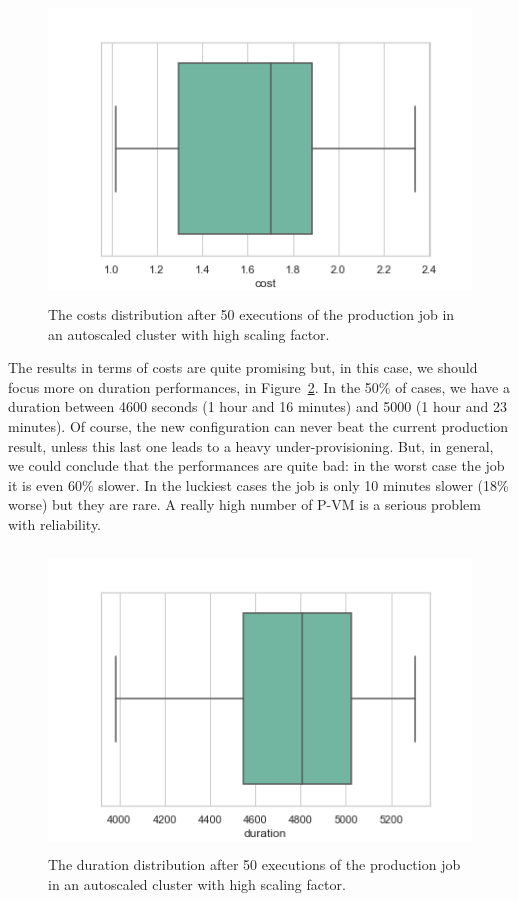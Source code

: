 \documentclass[12pt,twoside,cucitura]{toptesi}
\begin{document}
\begin{figure}
\centering
\includegraphics[height=80mm]{high-cost}
\caption{The costs distribution after 50 executions of the production job in an autoscaled cluster with high scaling factor.}\label{fig:high-cost}
\end{figure}

The results in terms of costs are quite promising but, in this case, we should focus more on duration performances, in Figure~\ref{fig:high-duration}. In the 50\% of cases, we have a duration between 4600 seconds (1 hour and 16 minutes) and 5000 (1 hour and 23 minutes). Of course, the new configuration can never beat the current production result, unless this last one leads to a heavy under-provisioning. But, in general, we could conclude that the performances are quite bad: in the worst case the job it is even 60\% slower. In the luckiest cases the job is only 10 minutes slower (18\% worse) but they are rare. A really high number of P-VM is a serious problem with reliability.

\begin{figure}
\centering
\includegraphics[height=80mm]{high-duration}
\caption{The duration distribution after 50 executions of the production job in an autoscaled cluster with high scaling factor.}\label{fig:high-duration}
\end{figure}
\end{document}
